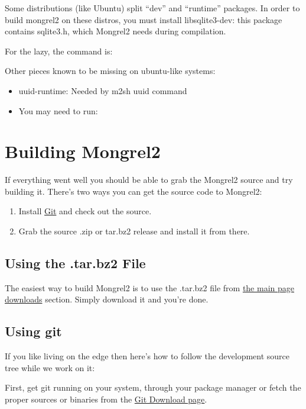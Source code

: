 Some distributions (like Ubuntu) split ``dev'' and ``runtime'' packages.
In order to build mongrel2 on these distros, you must install libsqlite3-dev:
this package contains sqlite3.h, which Mongrel2 needs during compilation.

For the lazy, the command is: 

Other pieces known to be missing on ubuntu-like systems: 

\begin{itemize}
\item uuid-runtime: Needed by m2sh uuid command
\item You may need to run:  
\end{itemize}


\section{Building Mongrel2}

If everything went well you should be able to grab the Mongrel2 source
and try building it.  There's two ways you can get the source code to
Mongrel2:

\begin{enumerate}
\item Install \href{http://git-scm.org}{Git} and check out the source.
\item Grab the source .zip or tar.bz2 release and install it from there.
\end{enumerate}

\subsection{Using the .tar.bz2 File}

The easiest way to build Mongrel2 is to use the .tar.bz2 file from 
\href{http://mongrel2.org/home#download}{the main page downloads} section.
Simply download it and you're done.


\subsection{Using git}

If you like living on the edge then here's how to follow the development source
tree while we work on it:

First, get git running on your system, through your package manager or fetch
the proper sources or binaries from the \href{http://git-scm.com/download}{Git Download page}.

